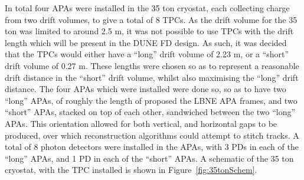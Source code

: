 In total four APAs were installed in the 35 ton cryostat, each collecting charge from two drift volumes, to give a total of 8 TPCs. As the drift volume for the 35 ton was limited to around 2.5 m, it was not possible to use TPCs with the drift length which will be present in the DUNE FD design. As such, it was decided that the TPCs would either have a ``long'' drift volume of 2.23 m, or a ``short'' drift volume of 0.27 m. These lengths were chosen so as to represent a reasonable drift distance in the ``short'' drift volume, whilst also maximising the ``long'' drift distance. The four APAs which were installed were done so, so as to have two ``long'' APAs, of roughly the length of proposed the LBNE APA frames, and two ``short'' APAs, stacked on top of each other, sandwiched between the two ``long'' APAs. This orientation allowed for both vertical, and horizontal gaps to be produced, over which reconstruction algorithms could attempt to stitch tracks. A total of 8 photon detectors were installed in the APAs, with 3 PDs in each of the ``long'' APAs, and 1 PD in each of the ``short'' APAs. A schematic of the 35 ton cryostat, with the TPC installed is shown in Figure~\ref{fig:35tonSchem}. \\

